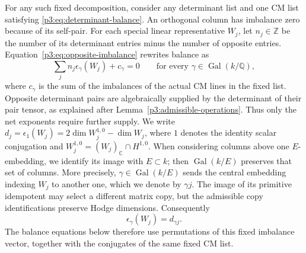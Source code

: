 \documentclass[11pt]{article}
\newcommand{\Q}{\mathbb Q}
\newcommand{\C}{\mathbb C}
\numberwithin{equation}{section}
\begin{document}
For any such fixed decomposition, consider any determinant list and
one CM list satisfying \eqref{p3:eq:determinant-balance}.
An orthogonal column has
imbalance zero because of its self-pair.  For each special linear
representative \(W_j\), let \(n_j\in\mathbb Z\) be the number
of its determinant entries minus the number of opposite entries.
Equation~\eqref{p3:eq:opposite-imbalance} rewrites balance as
\begin{equation}
 \label{p3ab:eq:balance}
 \sum_j n_j\epsilon_\gamma(W_j)+c_\gamma=0
 \qquad\text{for every }\gamma\in\operatorname{Gal}(k/\Q),
\end{equation}
where \(c_\gamma\) is the sum of the imbalances of the actual CM
lines in the fixed list.  Opposite determinant pairs are
algebraically supplied by the determinant of their pair tensor,
as explained after Lemma~\ref{p3:admissible-operations}.  Thus
only the net exponents require further supply.  We write
\(d_j=\epsilon_1(W_j)=2\dim W_j^{1,0}-\dim W_j\), where
\(1\) denotes the identity scalar conjugation and
\(W_j^{1,0}=(W_j)_\C\cap H^{1,0}\).  When considering columns
above one \(E\)-embedding, we identify its image with \(E\subset k\);
then \(\operatorname{Gal}(k/E)\) preserves that set of columns.
More precisely, \(\gamma\in\operatorname{Gal}(k/E)\) sends the
central embedding indexing
\(W_j\) to another one, which we denote by \(\gamma j\).
The image of its primitive idempotent may select a different matrix
copy, but the admissible copy identifications preserve Hodge
dimensions.  Consequently
\[
 \epsilon_\gamma(W_j)=d_{\gamma j}.
\]
The balance equations below therefore use permutations of this
fixed imbalance vector, together with the conjugates of the same
fixed CM list.
\end{document}
